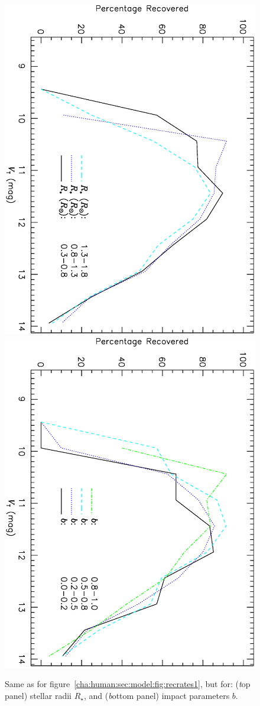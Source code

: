 \begin{figure}
\begin{center}
\centering
\includegraphics[width=.55\textwidth, angle=90]{7_comp_h}\\
\includegraphics[width=.55\textwidth, angle=90]{7_comp_i}\\
\caption[BLS recovery rates for different stellar radii and impact parameters]{%
Same as for figure~\ref{cha:human:sec:model:fig:recrates1}, but for: %
({\textit top panel})  stellar radii $R_{\star}$, and %
({\textit bottom panel})  impact parameters $b$. %
}\label{cha:human:sec:model:fig:recrates2}
\end{center}
\end{figure}

